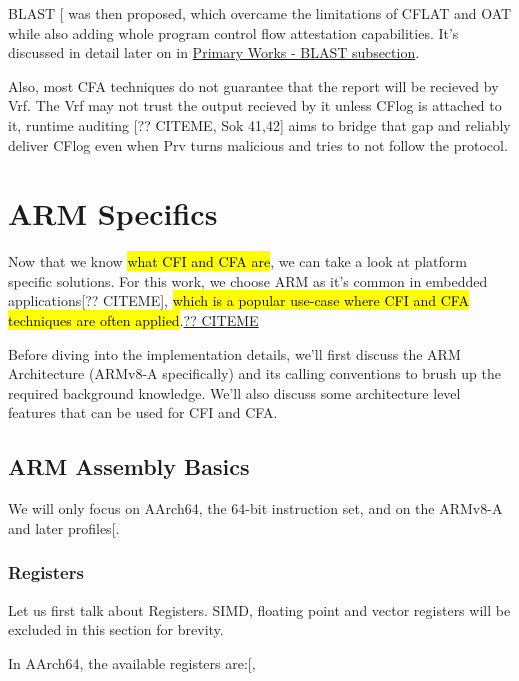 \documentclass[a4paper, nobind]{templates/ociamthesis}
\begin{document}
BLAST {[}\citeproc{ref-blast}{25}{]} was then proposed, which overcame the limitations of CFLAT and OAT while
also adding whole program control flow attestation capabilities. It's discussed
in detail later on in \hyperref[blast]{Primary Works - BLAST subsection}.

Also, most CFA techniques do not guarantee that the report will be recieved by Vrf.
The Vrf may not trust the output recieved by it unless CFlog is attached to it,
runtime auditing {[}?? CITEME, Sok 41,42{]} aims to bridge that gap and reliably deliver
CFlog even when Prv turns malicious and tries to not follow the protocol.

\section{ARM Specifics}\label{arm-specifics}

Now that we know \hl{what CFI and CFA are}, we can take a look at platform specific solutions.
For this work, we choose ARM as it's common in embedded applications{[}?? CITEME{]},
\hl{which is a popular use-case where CFI and CFA techniques are often applied}.\href{}{?? CITEME}

Before diving into the implementation details, we'll first discuss the ARM Architecture
(ARMv8-A specifically) and its calling conventions to brush up the required background knowledge.
We'll also discuss some architecture level features that can be used for CFI and CFA.

\subsection{ARM Assembly Basics}\label{arm-assembly-basics}

We will only focus on AArch64, the 64-bit instruction set, and on the ARMv8-A and later profiles{[}\citeproc{ref-arm-arch-manual}{7}{]}.

\subsubsection{Registers}\label{registers}

Let us first talk about Registers.
SIMD, floating point and vector registers will be excluded in this section for brevity.

In AArch64, the available registers are:{[}, \citeproc{ref-arm-isa}{6}{]}
\end{document}
